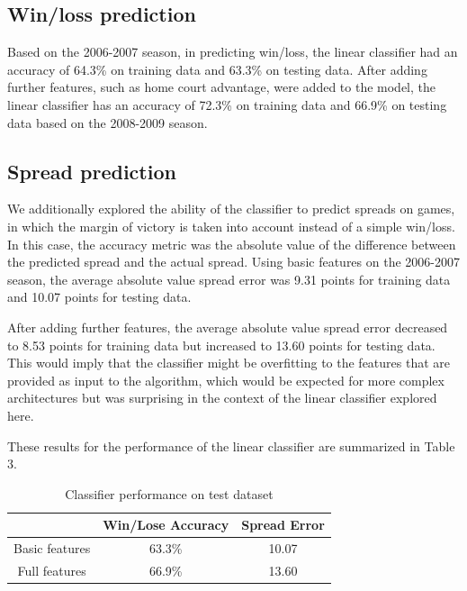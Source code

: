 \documentclass{article}
\begin{document}
\subsection{Win/loss prediction}
Based on the 2006-2007 season, in predicting win/loss, the linear classifier had an accuracy of 64.3\% on training data and 63.3\% on testing data. After adding further features, such as home court advantage, were added to the model, the linear classifier has an accuracy of 72.3\% on training data and 66.9\% on testing data based on the 2008-2009 season.

\subsection{Spread prediction}

We additionally explored the ability of the classifier to predict spreads on games, in which the margin of victory is taken into account instead of a simple win/loss. In this case, the accuracy metric was the absolute value of the difference between the predicted spread and the actual spread. Using basic features on the 2006-2007 season, the average absolute value spread error was 9.31 points for training data and 10.07 points for testing data.

After adding further features, the average absolute value spread error decreased to 8.53 points for training data but increased to 13.60 points for testing data. This would imply that the classifier might be overfitting to the features that are provided as input to the algorithm, which would be expected for more complex architectures but was surprising in the context of the linear classifier explored here.

These results for the performance of the linear classifier are summarized in Table 3.
\begin{table}
  \begin{center}
    \begin{tabular}{ | c | c | c | }
      \hline
                      & Win/Lose Accuracy & Spread Error  \\ \hline
      Basic features  & 63.3\%            & 10.07         \\ \hline
      Full features  & 66.9\%            & 13.60         \\ \hline
    \end{tabular}
  \end{center}
  \caption{Classifier performance on test dataset}
\end{table}
\end{document}
